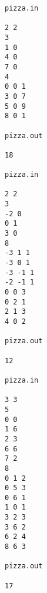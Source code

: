 \begin{verbatim}
pizza.in 
 
2 2 
3 
1 0 
4 0 
7 0 
4 
0 0 1 
3 0 7 
5 0 9 
8 0 1 
 
pizza.out 
 
18 

pizza.in 
 
2 2 
3 
-2 0 
0 1 
3 0 
8 
-3 1 1 
-3 0 1 
-3 -1 1 
-2 -1 1 
0 0 3 
0 2 1 
2 1 3 
4 0 2 
 
pizza.out 
 
12 

pizza.in 
 
3 3 
5 
0 0 
1 6 
2 3 
6 6 
7 2 
8 
0 1 2 
0 5 3 
0 6 1 
1 0 1 
3 2 3 
3 6 2 
6 2 4 
8 6 3 
 
pizza.out 
 
17 
\end{verbatim}